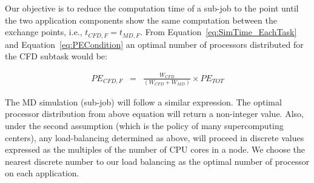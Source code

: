 \documentclass[conference,final]{IEEEtran}
\begin{document}
Our objective is to reduce the computation time of a sub-job to the point until the two application components show the same computation between the exchange points, i.e., $t_{CFD,F} = t_{MD,F}$. From Equation~\ref{eq:SimTime_EachTask} and Equation~\ref{eq:PECondition} an optimal number of processors distributed for the CFD subtask would be:

\vspace{-.2em}
\footnotesize
\begin{eqnarray}
PE_{CFD,F} & = & \frac {W_{CFD}} {(W_{CFD} + W_{MD})} \times PE_{TOT}
\end{eqnarray}
\normalsize

The MD simulation (sub-job) will follow a similar expression. The optimal processor distribution from above equation will return a non-integer value. Also, under the second assumption (which is the policy of many supercomputing centers), any load-balancing determined as above, will proceed in discrete values expressed as the multiples of the number of CPU cores in a node. We choose the nearest discrete number to our load balancing as the optimal number of processor on each application.
\newline
\newline
\end{document}
